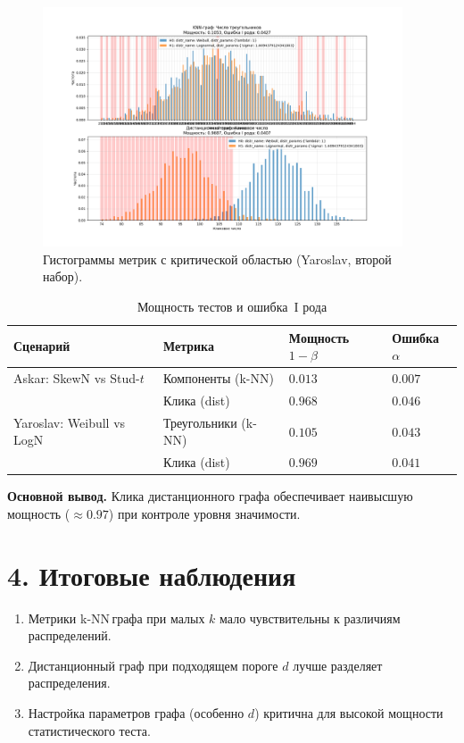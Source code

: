 \documentclass[a4paper,12pt]{article}
\begin{document}
\begin{figure}[H]
    \centering
    \includegraphics[width=0.95\textwidth]{Graphics/part3_results_1_Yaroslav.png}
    \caption{Гистограммы метрик с критической областью (Yaroslav, второй набор).}
    \label{fig:part3-1-yaroslav}
\end{figure}

\begin{table}[H]
    \centering
    \caption{Мощность тестов и ошибка~I рода}
    \label{tab:power}
    \begin{tabular}{@{}llll@{}}
        \toprule
        Сценарий & Метрика & Мощность $1-\beta$ & Ошибка $\alpha$ \\
        \midrule
        Askar: SkewN vs Stud-$t$ & Компоненты (k-NN) & $0.013$ & $0.007$ \\
        & Клика (dist) & $0.968$ & $0.046$ \\
        Yaroslav: Weibull vs LogN & Треугольники (k-NN) & $0.105$ & $0.043$ \\
        & Клика (dist) & $0.969$ & $0.041$ \\
        \bottomrule
    \end{tabular}
\end{table}

\noindent\textbf{Основной вывод.} Клика дистанционного графа обеспечивает наивысшую мощность (\(\approx0.97\)) при контроле уровня значимости.

\section*{4. Итоговые наблюдения}

\begin{enumerate}
    \item Метрики k\nobreakdash-NN\,графа при малых $k$ мало чувствительны к различиям распределений.
    \item Дистанционный граф при подходящем пороге $d$ лучше разделяет распределения.
    \item Настройка параметров графа (особенно $d$) критична для высокой мощности статистического теста.
\end{enumerate}
\end{document}
